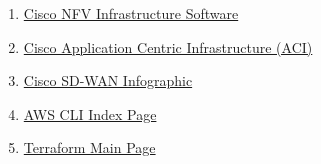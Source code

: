 \begin{enumerate}
  \item \href{https://www.cisco.com/c/en/us/solutions/collateral/enterprise-networks/enterprise-network-functions-virtualization-nfv/datasheet-c78-738570.html}{Cisco NFV Infrastructure Software}
  \item \href{https://www.cisco.com/c/en/us/solutions/data-center-virtualization/application-centric-infrastructure/index.html}{Cisco Application Centric Infrastructure (ACI)}
  \item \href{https://www.cisco.com/c/dam/en/us/solutions/collateral/enterprise-networks/sd-wan/nb-07-cte-infograph-golin-en.pdf}{Cisco SD-WAN Infographic}
  \item \href{https://docs.aws.amazon.com/cli/index.html#lang/en_us}{AWS CLI Index Page}
  \item \href{https://www.terraform.io/}{Terraform Main Page}
\end{enumerate}

